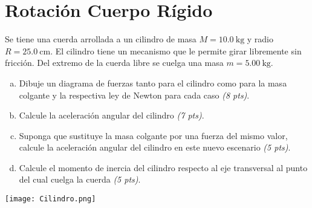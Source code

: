 \documentclass[
  12pt,
]{article}
\newcommand{\pts}[1]{ {\it (#1 pts)}}
\newcommand{\unit}[1]{\:\mathrm{#1}}
\begin{document}
\newpage
\setcounter{section}{0}
\section{Rotación Cuerpo Rígido}
Se tiene una cuerda arrollada a un cilindro de masa
$M = 10.0 \unit{kg}$ y radio $R = 25.0 \unit{cm}$.
El cilindro tiene un mecanismo que le permite girar
libremente sin fricción. Del extremo de la cuerda
libre se cuelga una masa  $m = 5.00 \unit{kg}$.
\begin{enumerate}[a)]
  \item Dibuje un diagrama de fuerzas tanto para el
    cilindro como para la masa colgante y la respectiva 
    ley de Newton para cada caso \pts{8}.
  \item Calcule la aceleración angular del cilindro \pts{7}.
  \item Suponga que sustituye la masa colgante por una
    fuerza del mismo valor, calcule la aceleración 
    angular del cilindro en este nuevo escenario \pts{5}.
  \item Calcule el momento de inercia del cilindro
    respecto al eje transversal al punto del cual cuelga
    la cuerda \pts{5}.
\end{enumerate}
\begin{center}
  \texttt{[image: Cilindro.png]}
\end{center}
\end{document}
